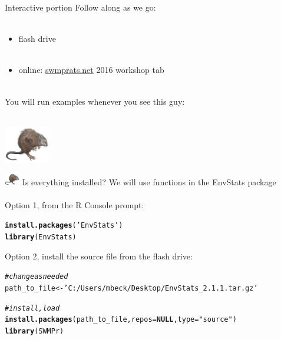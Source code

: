\documentclass[xcolor=dvipsnames,serif]{beamer}\usepackage[]{graphicx}\usepackage[]{color}
\makeatletter
\newcommand{\hlstr}[1]{\textcolor[rgb]{0.192,0.494,0.8}{#1}}%
\newcommand{\hlcom}[1]{\textcolor[rgb]{0.678,0.584,0.686}{\textit{#1}}}%
\newcommand{\hlstd}[1]{\textcolor[rgb]{0.345,0.345,0.345}{#1}}%
\newcommand{\hlkwa}[1]{\textcolor[rgb]{0.161,0.373,0.58}{\textbf{#1}}}%
\newcommand{\hlkwb}[1]{\textcolor[rgb]{0.69,0.353,0.396}{#1}}%
\newcommand{\hlkwc}[1]{\textcolor[rgb]{0.333,0.667,0.333}{#1}}%
\newcommand{\hlkwd}[1]{\textcolor[rgb]{0.737,0.353,0.396}{\textbf{#1}}}%
\newenvironment{kframe}{%
 \def\at@end@of@kframe{}%
 \ifinner\ifhmode%
  \def\at@end@of@kframe{\end{minipage}}%
  \begin{minipage}{\columnwidth}%
 \fi\fi%
 \def\FrameCommand##1{\hskip\@totalleftmargin \hskip-\fboxsep
 \colorbox{shadecolor}{##1}\hskip-\fboxsep
     \hskip-\linewidth \hskip-\@totalleftmargin \hskip\columnwidth}%
 \MakeFramed {\advance\hsize-\width
   \@totalleftmargin\z@ \linewidth\hsize
   \@setminipage}}%
 {\par\unskip\endMakeFramed%
 \at@end@of@kframe}
\newenvironment{knitrout}{}{} %
\makeatother
\begin{document}
\begin{frame}{Interactive portion}
\onslide<+->
Follow along as we go:\\~\\
\begin{itemize}
\item flash drive\\~\\
\item online: \href{http://swmprats.net/}{swmprats.net} 2016 workshop tab \\~\\
\end{itemize}
\onslide<+->
You will run examples whenever you see this guy: \\~\\
\centerline{\includegraphics[width = 0.15\textwidth]{imgs/swmprat.png}}
\end{frame}

\begin{frame}[fragile]{\includegraphics[width = 0.05\textwidth]{imgs/swmprat.png} Is everything installed?}
We will use functions in the EnvStats package \\~\\
Option 1, from the R Console prompt:
\begin{knitrout}\scriptsize
{}\color{fgcolor}\begin{kframe}
\begin{alltt}
\hlkwd{install.packages}\hlstd{(}\hlstr{'EnvStats'}\hlstd{)}
\hlkwd{library}\hlstd{(EnvStats)}
\end{alltt}
\end{kframe}
\end{knitrout}
\vspace{0.1in}
Option 2, install the source file from the flash drive:
\begin{knitrout}\scriptsize
{}\color{fgcolor}\begin{kframe}
\begin{alltt}
\hlcom{# change as needed}
\hlstd{path_to_file} \hlkwb{<-} \hlstr{'C:/Users/mbeck/Desktop/EnvStats_2.1.1.tar.gz'}

\hlcom{# install, load}
\hlkwd{install.packages}\hlstd{(path_to_file,} \hlkwc{repos} \hlstd{=} \hlkwa{NULL}\hlstd{,} \hlkwc{type}\hlstd{=}\hlstr{"source"}\hlstd{)}
\hlkwd{library}\hlstd{(SWMPr)}
\end{alltt}
\end{kframe}
\end{knitrout}
\end{frame}
\end{document}
